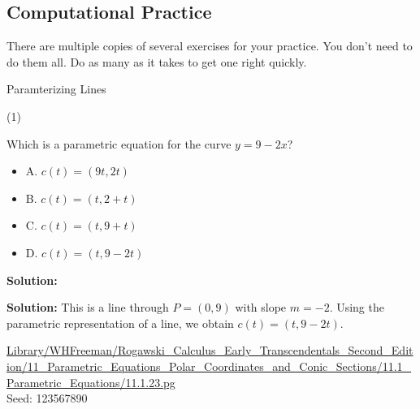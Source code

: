 \documentclass[10pt,]{book}
\theoremstyle{plain}
\theoremstyle{definition}
\theoremstyle{definition}
\theoremstyle{definition}
\theoremstyle{definition}
\theoremstyle{definition}
\numberwithin{equation}{section}
\begin{document}
\subsection[{Computational Practice}]{Computational Practice}\label{exercises-6}
There are multiple copies of several exercises for your practice. You don't need to do them all. Do as many as it takes to get one right quickly.%
\hypertarget{exercisegroup-1}{}\par\noindent Paramterizing Lines%
\begin{exercisegroup}(1)
\exercise[1.]\hypertarget{exercise-18}{}\mbox{}\\ %
\begin{mdframed}
{
\par 
Which is a parametric equation for the curve \(y = 9-2x\)?
\par 

\begin{itemize}
\item{A. \(c(t) = \left(9t,2t\right)\)}
\item{B. \(c(t) = \left(t,2+t\right)\)}
\item{C. \(c(t) = \left(t,9+t\right)\)}
\item{D. \(c(t) = \left(t,9-2t\right)\)}

\end{itemize}




\par \par {\bf Solution: }\par 
\par {\bf Solution: }
This is a line through \(P = (0, 9)\) with slope \(m = - 2\).  Using the parametric representation of a line, we obtain \(c(t) = \left(t,9-2t\right)\).

\par 
}\par\vspace*{2ex}%
{\tiny\ttfamily\noindent\url{Library/WHFreeman/Rogawski_Calculus_Early_Transcendentals_Second_Edition/11_Parametric_Equations_Polar_Coordinates_and_Conic_Sections/11.1_Parametric_Equations/11.1.23.pg}\\Seed: 123567890\hfill}\end{mdframed}
\exercise[2.]\hypertarget{exercise-19}{}\mbox{}\\ %
\end{exercisegroup}
\end{document}
